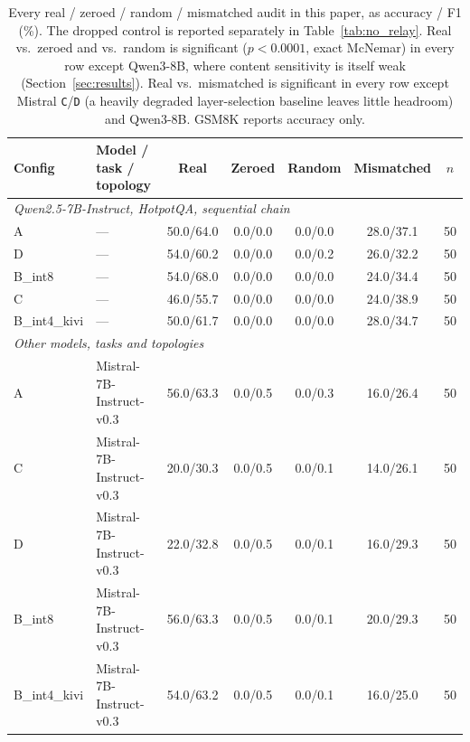 \begin{table}[t]
\centering
\small
\caption{Every real / zeroed / random / mismatched audit in this paper, as accuracy / F1 (\%). The dropped control is reported separately in Table~\ref{tab:no_relay}. Real vs.\ zeroed and vs.\ random is significant ($p<0.0001$, exact McNemar) in every row except Qwen3-8B, where content sensitivity is itself weak (Section~\ref{sec:results}). Real vs.\ mismatched is significant in every row except Mistral \texttt{C}/\texttt{D} (a heavily degraded layer-selection baseline leaves little headroom) and Qwen3-8B. GSM8K reports accuracy only.}
\label{tab:causal_audit_full}
\begin{tabular}{llccccc}
\toprule
\textbf{Config} & \textbf{Model / task / topology} & \textbf{Real} & \textbf{Zeroed} & \textbf{Random} & \textbf{Mismatched} & \textbf{$n$} \\
\midrule
\multicolumn{7}{l}{\emph{Qwen2.5-7B-Instruct, HotpotQA, sequential chain}} \\
A            & ---                         & 50.0/64.0 & 0.0/0.0  & 0.0/0.0  & 28.0/37.1 & 50 \\
D            & ---                         & 54.0/60.2 & 0.0/0.0  & 0.0/0.2  & 26.0/32.2 & 50 \\
B\_int8      & ---                         & 54.0/68.0 & 0.0/0.0  & 0.0/0.0  & 24.0/34.4 & 50 \\
C            & ---                         & 46.0/55.7 & 0.0/0.0  & 0.0/0.0  & 24.0/38.9 & 50 \\
B\_int4\_kivi& ---                         & 50.0/61.7 & 0.0/0.0  & 0.0/0.0  & 28.0/34.7 & 50 \\
\midrule
\multicolumn{7}{l}{\emph{Other models, tasks and topologies}} \\
A            & Mistral-7B-Instruct-v0.3    & 56.0/63.3 & 0.0/0.5  & 0.0/0.3  & 16.0/26.4 & 50 \\
C            & Mistral-7B-Instruct-v0.3    & 20.0/30.3 & 0.0/0.5  & 0.0/0.1  & 14.0/26.1 & 50 \\
D            & Mistral-7B-Instruct-v0.3    & 22.0/32.8 & 0.0/0.5  & 0.0/0.1  & 16.0/29.3 & 50 \\
B\_int8      & Mistral-7B-Instruct-v0.3    & 56.0/63.3 & 0.0/0.5  & 0.0/0.1  & 20.0/29.3 & 50 \\
B\_int4\_kivi& Mistral-7B-Instruct-v0.3    & 54.0/63.2 & 0.0/0.5  & 0.0/0.1  & 16.0/25.0 & 50 \\

\end{tabular}
\end{table}
